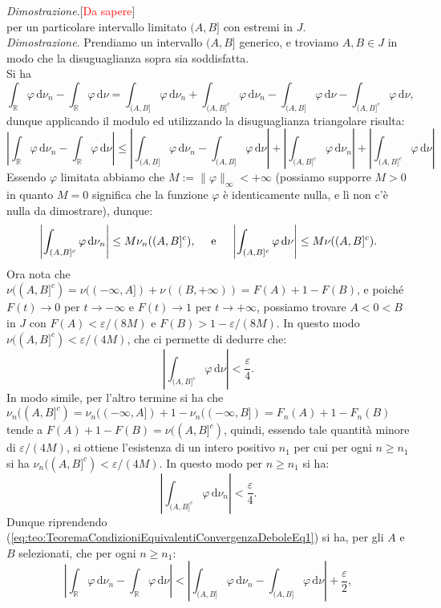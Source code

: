 \documentclass[11pt]{book}
\makeatletter
\theoremstyle{Definizione}
\theoremstyle{TeoremaProposizioneLemmaCorollario}
\theoremstyle{OsservazioneNota}
\renewenvironment{proof}[1][\proofname]{\par
  \normalfont \topsep6\p@\@plus6\p@\relax
  \trivlist
  \item[\hskip\labelsep
        \itshape
    #1\@addpunct{.}]\ignorespaces
}{%
  \endtrivlist\@endpefalse
}
\newcommand{\R}{\mathbb{R}}
\renewcommand{\d}{\mathrm{d}}
\renewenvironment{proof}{\textsl{Dimostrazione}.}{}
\makeatother
\begin{document}
\begin{boxteo}{}
\begin{proof}[\textcolor{red}{Da sapere}]
$$$$
per un particolare intervallo limitato $(A,B]$ con estremi in $J$.\\
\textsl{Dimostrazione}. Prendiamo un intervallo $(A,B]$ generico, e troviamo $A,B\in J$ in modo che la disuguaglianza sopra sia soddisfatta.\\
Si ha
$$
\int_\R \varphi \,\d\nu_n - \int_\R \varphi \,\d\nu = \int_{(A,B]} \varphi\,\d\nu_n + \int_{(A,B]^c}\varphi \,\d\nu_n - \int_{(A,B]}\varphi \,\d\nu-\int_{(A,B]^c}\varphi \,\d\nu,
$$ 
dunque applicando il modulo ed utilizzando la disuguaglianza triangolare risulta:
\begin{equation}\label{eq:teo:TeoremaCondizioniEquivalentiConvergenzaDeboleEq1}
\left|\int_\R \varphi \,\d\nu_n -\int_\R \varphi \,\d\nu\right| \leq \left|\int_{(A,B]}\varphi \,\d\nu_n-\int_{(A,B]}\varphi \,\d\nu\right|+\left|\int_{(A,B]^c}\varphi \,\d\nu_n\right|+\left|\int_{(A,B]^c}\varphi \,\d\nu\right|
\end{equation}
Essendo $\varphi$ limitata abbiamo che $M:= \|\varphi\|_\infty < +\infty$ (possiamo supporre $M > 0$ in quanto $M = 0$ significa che la funzione $\varphi$ è identicamente nulla, e lì non c'è nulla da dimostrare), dunque:
$$
\left|\int_{(A,B]^c}\varphi \,\d\nu_n\right|\leq M \nu_n((A,B]^c),\quad \textup{ e }\quad \left|\int_{(A,B]^c}\varphi \,\d\nu\right| \leq M \nu((A,B]^c).
$$
Ora nota che $\nu((A,B]^c) = \nu((-\infty,A])+\nu((B,+\infty)) = F(A)+1-F(B)$, e poiché $F(t)\to 0$ per $t\to -\infty$ e $F(t) \to 1$ per $t\to +\infty$, possiamo trovare $A<0<B$ in $J$ con $F(A)< \varepsilon/(8M)$ e $F(B)> 1-\varepsilon/(8M)$. In questo modo $\nu((A,B]^c) < \varepsilon/(4M)$, che ci permette di dedurre che:
$$
\left|\int_{(A,B]^c}\varphi \,\d\nu\right| < \frac{\varepsilon}{4}.
$$
In modo simile, per l'altro termine si ha che $\nu_n((A,B]^c) = \nu_n((-\infty,A])+1-\nu_n((-\infty,B]) = F_n(A)+1-F_n(B)$ tende a $F(A)+1-F(B)= \nu((A,B]^c)$, quindi, essendo tale quantità minore di $\varepsilon/(4M)$, si ottiene l'esistenza di un intero positivo $n_1$ per cui per ogni $n\geq n_1$ si ha $\nu_n((A,B]^c) < \varepsilon/(4M)$. In questo modo per $n\geq n_1$ si ha:
$$
\left|\int_{(A,B]^c}\varphi \,\d\nu_n\right| < \frac{\varepsilon}{4}.
$$
Dunque riprendendo (\ref{eq:teo:TeoremaCondizioniEquivalentiConvergenzaDeboleEq1}) si ha, per gli $A$ e $B$ selezionati, che per ogni $n\geq n_1$:
\begin{equation}\label{eq:teo:TeoremaCondizioniEquivalentiConvergenzaDeboleEq2}
\left|\int_\R \varphi \,\d\nu_n - \int_\R \varphi \,\d\nu\right| < \left|\int_{(A,B]}\varphi\,\d\nu_n - \int_{(A,B]}\varphi \,\d\nu\right|+\frac{\varepsilon}{2},

\end{equation}
\end{proof}
\end{boxteo}
\end{document}
